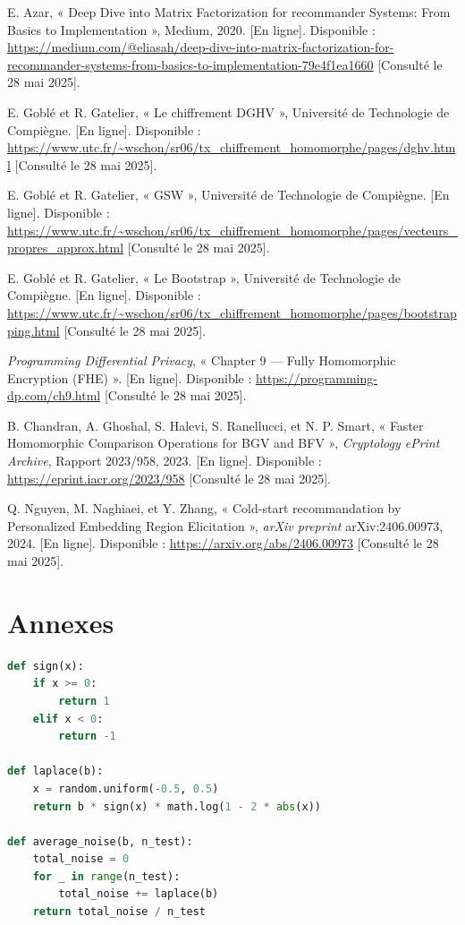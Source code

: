 \documentclass{article}
\begin{document}
\begin{thebibliography}{99}
    E. Azar, « Deep Dive into Matrix Factorization for recommander Systems: From Basics to Implementation », Medium, 2020. [En ligne]. Disponible : \url{https://medium.com/@eliasah/deep-dive-into-matrix-factorization-for-recommander-systems-from-basics-to-implementation-79e4f1ea1660} [Consulté le 28 mai 2025].

    E. Goblé et R. Gatelier, « Le chiffrement DGHV », Université de Technologie de Compiègne. [En ligne]. Disponible : \url{https://www.utc.fr/~wschon/sr06/tx_chiffrement_homomorphe/pages/dghv.html} [Consulté le 28 mai 2025].

    E. Goblé et R. Gatelier, « GSW », Université de Technologie de Compiègne. [En ligne]. Disponible : \url{https://www.utc.fr/~wschon/sr06/tx_chiffrement_homomorphe/pages/vecteurs_propres_approx.html} [Consulté le 28 mai 2025].

    E. Goblé et R. Gatelier, « Le Bootstrap », Université de Technologie de Compiègne. [En ligne]. Disponible : \url{https://www.utc.fr/~wschon/sr06/tx_chiffrement_homomorphe/pages/bootstrapping.html} [Consulté le 28 mai 2025].

    \emph{Programming Differential Privacy}, « Chapter 9 — Fully Homomorphic Encryption (FHE) ». [En ligne]. Disponible : \url{https://programming-dp.com/ch9.html} [Consulté le 28 mai 2025].

    B. Chandran, A. Ghoshal, S. Halevi, S. Ranellucci, et N. P. Smart, « Faster Homomorphic Comparison Operations for BGV and BFV », \emph{Cryptology ePrint Archive}, Rapport 2023/958, 2023. [En ligne]. Disponible : \url{https://eprint.iacr.org/2023/958} [Consulté le 28 mai 2025].

    Q. Nguyen, M. Naghiaei, et Y. Zhang, « Cold-start recommandation by Personalized Embedding Region Elicitation », \emph{arXiv preprint} arXiv:2406.00973, 2024. [En ligne]. Disponible : \url{https://arxiv.org/abs/2406.00973} [Consulté le 28 mai 2025].

\end{thebibliography}

\newpage
\section*{Annexes}

\begin{lstlisting}[language=Python, caption={Fonction de génération de bruit Laplacien}, label={lst:laplace}]
def sign(x):
    if x >= 0:
        return 1
    elif x < 0:
        return -1

def laplace(b):
    x = random.uniform(-0.5, 0.5)
    return b * sign(x) * math.log(1 - 2 * abs(x))

def average_noise(b, n_test):
    total_noise = 0
    for _ in range(n_test):
        total_noise += laplace(b)
    return total_noise / n_test 
\end{lstlisting}
\end{document}
